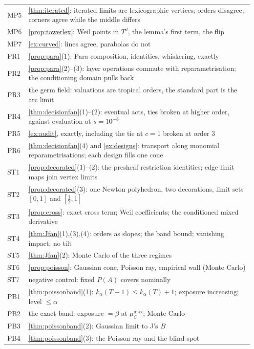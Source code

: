 \documentclass[11pt]{article}
\theoremstyle{definition}\newtheorem{definition}[theorem]{Definition}\newtheorem{remark}[theorem]{Remark}\newtheorem{example}[theorem]{Example}
\begin{document}
\begin{center}
\begin{tabular}{lp{}}
MP5 & \cref{thm:iterated}: iterated limits are lexicographic vertices; orders disagree; corners agree while the middle differs\\
MP6 & \cref{prop:towerlex}: Weil points in $T^d$, the lemma's first term, the flip\\
MP7 & \cref{ex:curved}: lines agree, parabolas do not\\\midrule
PR1 & \cref{prop:para}(1): Para composition, identities, whiskering, exactly\\
PR2 & \cref{prop:para}(2)--(3): layer operations commute with reparametrisation; the conditioning domain pulls back\\
PR3 & the germ field: valuations are tropical orders, the standard part is the arc limit\\
PR4 & \cref{thm:decisionfan}(1)--(2): eventual acts, ties broken at higher order, against evaluation at $s=10^{-8}$\\
PR5 & \cref{ex:audit}, exactly, including the tie at $c=1$ broken at order $3$\\
PR6 & \cref{thm:decisionfan}(4) and \cref{ex:designs}: transport along monomial reparametrisations; each design fills one cone\\\midrule
ST1 & \cref{prop:decorated}(1)--(2): the presheaf restriction identities; edge limit maps join vertex limits\\
ST2 & \cref{prop:decorated}(3): one Newton polyhedron, two decorations, limit sets $[0,1]$ and $[\tfrac12,1]$\\
ST3 & \cref{prop:cross}: exact cross term; Weil coefficients; the conditioned mixed derivative\\
ST4 & \cref{thm:Jfan}(1),(3),(4): orders as slopes; the band bound; vanishing impact; no tilt\\
ST5 & \cref{thm:Jfan}(2): Monte Carlo of the three regimes\\
ST6 & \cref{prop:poisson}: Gaussian cone, Poisson ray, empirical wall (Monte Carlo)\\
ST7 & negative control: fixed $P(A)$ covers nominally\\\midrule
PB1 & \cref{thm:poissonband}(1): $k_\alpha(T+1)\le k_\alpha(T)+1$; exposure increasing; level $\le\alpha$\\
PB2 & the exact band: exposure $=\beta$ at $\mu_C^{\max}$; Monte Carlo\\
PB3 & \cref{thm:poissonband}(2): Gaussian limit to J's $B$\\
PB4 & \cref{thm:poissonband}(3): the Poisson ray and the blind spot\\

\end{tabular}
\end{center}
\end{document}
